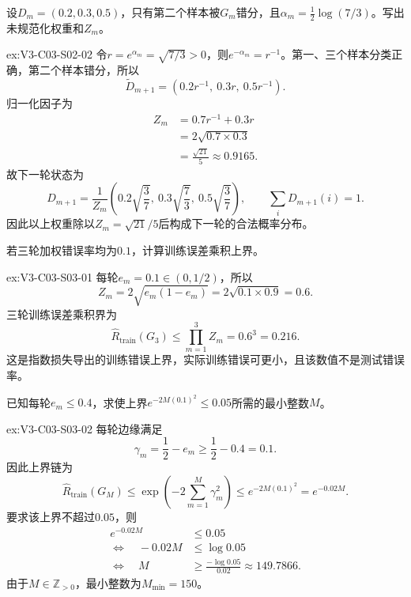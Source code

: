 \begin{SLChapterExercisePairSection}
\begin{exercise}\label{ex:V3-C03-S02-02}
设$D_m=(0.2,0.3,0.5)$，只有第二个样本被$G_m$错分，且$\alpha_m=\frac12\log(7/3)$。写出未规范化权重和$Z_m$。
\end{exercise}
\ifSLFullEdition
{}\label{sol:V3-C03-S02-02}
\begin{chapterexercisesolution}{ex:V3-C03-S02-02}
令$r=e^{\alpha_m}=\sqrt{7/3}>0$，则$e^{-\alpha_m}=r^{-1}$。第一、三个样本分类正确，第二个样本错分，所以
\[
\widetilde D_{m+1}
=\left(0.2r^{-1},\ 0.3r,\ 0.5r^{-1}\right).
\]
归一化因子为
\[
\begin{aligned}
Z_m
&=0.7r^{-1}+0.3r\\
&=2\sqrt{0.7\times0.3}\\
&=\frac{\sqrt{21}}5\approx0.9165.
\end{aligned}
\]
故下一轮状态为
\[
D_{m+1}=\frac1{Z_m}
\left(0.2\sqrt{\frac37},\ 0.3\sqrt{\frac73},\ 0.5\sqrt{\frac37}\right),
\qquad
\sum_iD_{m+1}(i)=1.
\]
因此以上权重除以$Z_m=\sqrt{21}/5$后构成下一轮的合法概率分布。
\end{chapterexercisesolution}
\fi

\begin{exercise}\label{ex:V3-C03-S03-01}
若三轮加权错误率均为$0.1$，计算训练误差乘积上界。
\end{exercise}
\ifSLFullEdition
{}\label{sol:V3-C03-S03-01}
\begin{chapterexercisesolution}{ex:V3-C03-S03-01}
每轮$e_m=0.1\in(0,1/2)$，所以
\[
Z_m=2\sqrt{e_m(1-e_m)}
=2\sqrt{0.1\times0.9}=0.6.
\]
三轮训练误差乘积界为
\[
\widehat R_{\mathrm{train}}(G_3)
\leq\prod_{m=1}^{3}Z_m
=0.6^3
=0.216.
\]
这是指数损失导出的训练错误上界，实际训练错误可更小，且该数值不是测试错误率。
\end{chapterexercisesolution}
\fi

\begin{exercise}\label{ex:V3-C03-S03-02}
已知每轮$e_m\leq0.4$，求使上界$e^{-2M(0.1)^2}\leq0.05$所需的最小整数$M$。
\end{exercise}
\ifSLFullEdition
{}\label{sol:V3-C03-S03-02}
\begin{chapterexercisesolution}{ex:V3-C03-S03-02}
每轮边缘满足
\[
\gamma_m=\frac12-e_m\geq\frac12-0.4=0.1.
\]
因此上界链为
\[
\widehat R_{\mathrm{train}}(G_M)
\leq\exp\!\left(-2\sum_{m=1}^{M}\gamma_m^2\right)
\leq e^{-2M(0.1)^2}=e^{-0.02M}.
\]
要求该上界不超过$0.05$，则
\[
\begin{aligned}
e^{-0.02M}&\leq0.05\\
\Longleftrightarrow\quad
-0.02M&\leq\log0.05\\
\Longleftrightarrow\quad
M&\geq\frac{-\log0.05}{0.02}\approx149.7866.
\end{aligned}
\]
由于$M\in\mathbb Z_{>0}$，最小整数为$M_{\min}=150$。
\end{chapterexercisesolution}
\fi


\end{SLChapterExercisePairSection}
